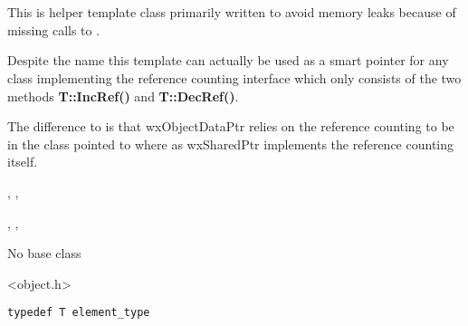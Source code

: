\section{}\label{wxobjectdataptr}

This is helper template class primarily written to avoid memory 
leaks because of missing calls to .

Despite the name this template can actually be used as a
smart pointer for any class implementing the reference
counting interface which only consists of the two methods
{\bf T::IncRef()} and {\bf T::DecRef()}.

The difference to  is that
wxObjectDataPtr relies on the reference counting to be in
the class pointed to where as wxSharedPtr implements the
reference counting itself.


,
,

, 
,



No base class


<object.h>


{\small%
\begin{verbatim}
typedef T element_type
\end{verbatim}
}%


